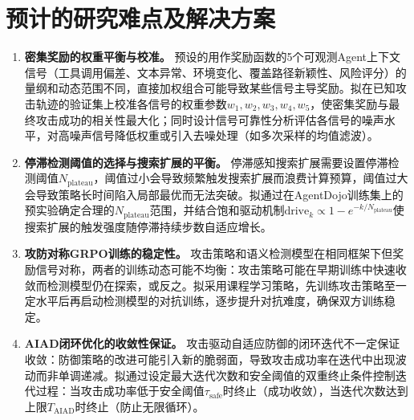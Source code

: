 \section{预计的研究难点及解决方案}

\begin{enumerate}
  \item \textbf{密集奖励的权重平衡与校准。} 预设的用作奖励函数的5个可观测Agent上下文信号（工具调用偏差、文本异常、环境变化、覆盖路径新颖性、风险评分）的量纲和动态范围不同，直接加权组合可能导致某些信号主导奖励。拟在已知攻击轨迹的验证集上校准各信号的权重参数$w_1, w_2, w_3, w_4, w_5$，使密集奖励与最终攻击成功的相关性最大化；同时设计信号可靠性分析评估各信号的噪声水平，对高噪声信号降低权重或引入去噪处理（如多次采样的均值滤波）。

  \item \textbf{停滞检测阈值的选择与搜索扩展的平衡。} 停滞感知搜索扩展需要设置停滞检测阈值$N_{\text{plateau}}$，阈值过小会导致频繁触发搜索扩展而浪费计算预算，阈值过大会导致策略长时间陷入局部最优而无法突破。拟通过在AgentDojo训练集上的预实验确定合理的$N_{\text{plateau}}$范围，并结合饱和驱动机制$\text{drive}_k \propto 1 - e^{-k/N_{\text{plateau}}}$使搜索扩展的触发强度随停滞持续步数自适应增长。

  \item \textbf{攻防对称GRPO训练的稳定性。} 攻击策略和语义检测模型在相同框架下但奖励信号对称，两者的训练动态可能不均衡：攻击策略可能在早期训练中快速收敛而检测模型仍在探索，或反之。拟采用课程学习策略，先训练攻击策略至一定水平后再启动检测模型的对抗训练，逐步提升对抗难度，确保双方训练稳定。

  \item \textbf{AIAD闭环优化的收敛性保证。} 攻击驱动自适应防御的闭环迭代不一定保证收敛：防御策略的改进可能引入新的脆弱面，导致攻击成功率在迭代中出现波动而非单调递减。拟通过设定最大迭代次数和安全阈值的双重终止条件控制迭代过程：当攻击成功率低于安全阈值$\tau_{\text{safe}}$时终止（成功收敛），当迭代次数达到上限$T_{\text{AIAD}}$时终止（防止无限循环）。

\end{enumerate}
